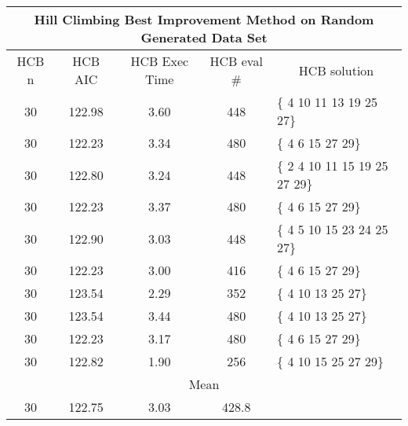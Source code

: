 \begin{tabular}{|c|c|c|c|l|}
	\hline
	\multicolumn{5}{|c|}{Hill Climbing Best Improvement Method on Random Generated Data Set}           \\ \hline
	HCB n & HCB AIC     & HCB Exec Time & HCB eval \# & \multicolumn{1}{c|}{HCB solution} \\ \hline
	30    & 122.98  & 3.60              & 448                    & \{ 4 10 11 13 19 25 27\}          \\ \hline
	30    & 122.23 & 3.34               & 480                    & \{ 4 6 15 27 29\}                 \\ \hline
	30    & 122.80 & 3.24              & 448                    & \{ 2 4 10 11 15 19 25 27 29\}     \\ \hline
	30    & 122.23 & 3.37               & 480                    & \{ 4 6 15 27 29\}                 \\ \hline
	30    & 122.90 & 3.03              & 448                    & \{ 4 5 10 15 23 24 25 27\}        \\ \hline
	30    & 122.23 & 3.00              & 416                    & \{ 4 6 15 27 29\}                 \\ \hline
	30    & 123.54 & 2.29              & 352                    & \{ 4 10 13 25 27\}                \\ \hline
	30    & 123.54 & 3.44              & 480                    & \{ 4 10 13 25 27\}                \\ \hline
	30    & 122.23 & 3.17              & 480                    & \{ 4 6 15 27 29\}                 \\ \hline
	30    & 122.82 & 1.90              & 256                    & \{ 4 10 15 25 27 29\}             \\ \hline
	\multicolumn{5}{|c|}{Mean}                                                                            \\ \hline
	30    & 122.75 & 3.03             & 428.8                  &                                   \\ \hline
\end{tabular}

